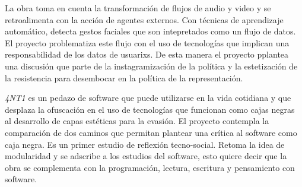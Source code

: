 La obra toma en cuenta la transformación de flujos de audio y video y se retroalimenta con la acción de agentes externos. Con técnicas de aprendizaje automático, detecta gestos faciales que son intepretados como un flujo de datos. El proyecto problematiza este flujo con el uso de tecnologías que implican una responsabilidad de los datos de usuarixs. De esta manera el proyecto pplantea una discusión que parte de la instagramización de la política y la estetización de la resistencia para desembocar en la política de la representación.

\textit{4NT1} es un pedazo de software que puede utilizarse en la vida cotidiana y que desplaza la ofuscación en el uso de tecnologías que funcionan como cajas negras al desarrollo de capas estéticas para la evasión. El proyecto contempla la comparación de dos caminos que permitan plantear una crítica al software como caja negra. Es un primer estudio de reflexión tecno-social. Retoma la idea de modularidad y se adscribe a los estudios del software, esto quiere decir que la obra se complementa con la programación, lectura, escritura y pensamiento con software.

